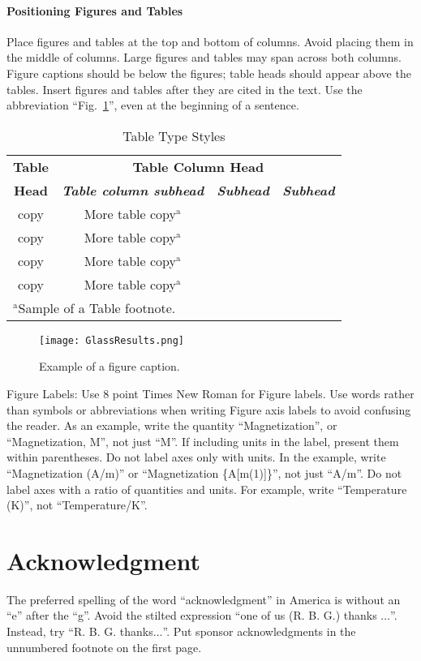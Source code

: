 \documentclass[conference]{IEEEtran}
\begin{document}
\paragraph{Positioning Figures and Tables} Place figures and tables at the top and
bottom of columns. Avoid placing them in the middle of columns. Large
figures and tables may span across both columns. Figure captions should be
below the figures; table heads should appear above the tables. Insert
figures and tables after they are cited in the text. Use the abbreviation
``Fig.~\ref{fig}'', even at the beginning of a sentence.

\begin{table}[htbp]
\caption{Table Type Styles}
\begin{center}
\begin{tabular}{|c|c|c|c|}
\hline
\textbf{Table}&\multicolumn{3}{|c|}{\textbf{Table Column Head}} \\
\cline{2-4}
\textbf{Head} & \textbf{\textit{Table column subhead}}& \textbf{\textit{Subhead}}& \textbf{\textit{Subhead}} \\
\hline
copy& More table copy$^{\mathrm{a}}$& &  \\
copy& More table copy$^{\mathrm{a}}$& &  \\
\hline
copy& More table copy$^{\mathrm{a}}$& &  \\
copy& More table copy$^{\mathrm{a}}$& &  \\
\hline

\multicolumn{4}{l}{$^{\mathrm{a}}$Sample of a Table footnote.}
\end{tabular}
\label{tab1}
\end{center}
\end{table}

\begin{figure}[htbp]
\centerline{\texttt{[image: GlassResults.png]}}
\caption{Example of a figure caption.}
\label{fig}
\end{figure}

Figure Labels: Use 8 point Times New Roman for Figure labels. Use words
rather than symbols or abbreviations when writing Figure axis labels to
avoid confusing the reader. As an example, write the quantity
``Magnetization'', or ``Magnetization, M'', not just ``M''. If including
units in the label, present them within parentheses. Do not label axes only
with units. In the example, write ``Magnetization (A/m)'' or ``Magnetization
\{A[m(1)]\}'', not just ``A/m''. Do not label axes with a ratio of
quantities and units. For example, write ``Temperature (K)'', not
``Temperature/K''.

\section*{Acknowledgment}

The preferred spelling of the word ``acknowledgment'' in America is without
an ``e'' after the ``g''. Avoid the stilted expression ``one of us (R. B.
G.) thanks $\ldots$''. Instead, try ``R. B. G. thanks$\ldots$''. Put sponsor
acknowledgments in the unnumbered footnote on the first page.


\nocite{*}
\noindent

\indent

\end{document}
